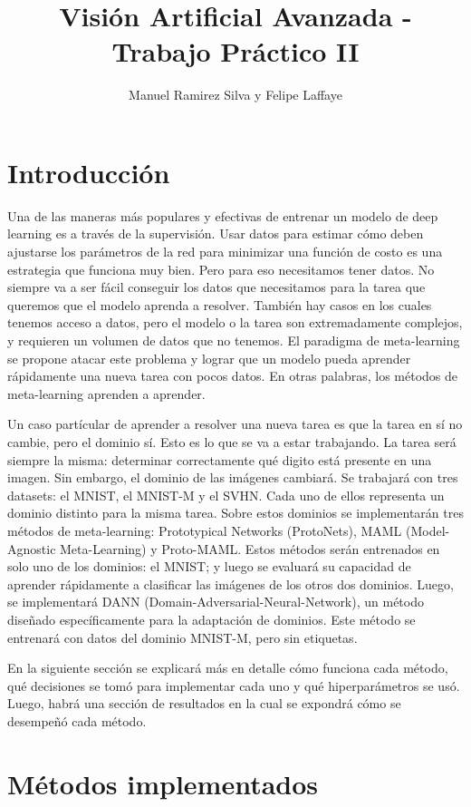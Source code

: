 \documentclass[12pt]{article}
\title{Visión Artificial Avanzada - Trabajo Práctico II}
\author{Manuel Ramirez Silva y Felipe Laffaye}
\date{}
\begin{document}
\maketitle

\section{Introducción}
Una de las maneras más populares y efectivas de entrenar un modelo de deep learning es a través de la supervisión. Usar datos para estimar cómo deben ajustarse los parámetros de la red para minimizar una función de costo es una estrategia que funciona muy bien. Pero para eso necesitamos tener datos. No siempre va a ser fácil conseguir los datos que necesitamos para la tarea que queremos que el modelo aprenda a resolver. También hay casos en los cuales tenemos acceso a datos, pero el modelo o la tarea son extremadamente complejos, y requieren un volumen de datos que no tenemos. El paradigma de meta-learning se propone atacar este problema y lograr que un modelo pueda aprender rápidamente una nueva tarea con pocos datos. En otras palabras, los métodos de meta-learning aprenden a aprender.

Un caso partícular de aprender a resolver una nueva tarea es que la tarea en sí no cambie, pero el dominio sí. Esto es lo que se va a estar trabajando. La tarea será siempre la misma: determinar correctamente qué digito está presente en una imagen. Sin embargo, el dominio de las imágenes cambiará. Se trabajará con tres datasets: el MNIST, el MNIST-M y el SVHN. Cada uno de ellos representa un dominio distinto para la misma tarea. Sobre estos dominios se implementarán tres métodos de meta-learning: Prototypical Networks (ProtoNets), MAML (Model-Agnostic Meta-Learning) y Proto-MAML. Estos métodos serán entrenados en solo uno de los dominios: el MNIST; y luego se evaluará su capacidad de aprender rápidamente a clasificar las imágenes de los otros dos dominios. Luego, se implementará DANN (Domain-Adversarial-Neural-Network), un método diseñado específicamente para la adaptación de dominios. Este método se entrenará con datos del dominio MNIST-M, pero sin etiquetas.

En la siguiente sección se explicará más en detalle cómo funciona cada método, qué decisiones se tomó para implementar cada uno y qué hiperparámetros se usó. Luego, habrá una sección de resultados en la cual se expondrá cómo se desempeñó cada método.

\section{Métodos implementados}
\end{document}
